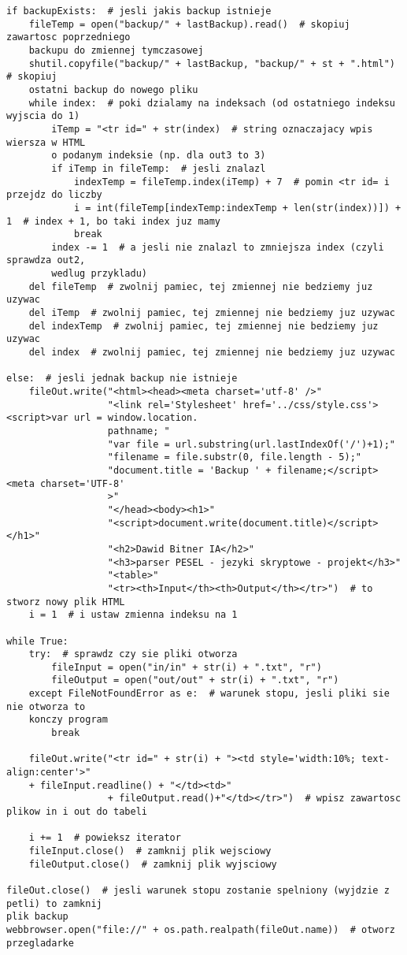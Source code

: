 \documentclass[12pt,a4paper]{article}
\begin{document}
\begin{verbatim}
if backupExists:  # jesli jakis backup istnieje
    fileTemp = open("backup/" + lastBackup).read()  # skopiuj zawartosc poprzedniego 
    backupu do zmiennej tymczasowej
    shutil.copyfile("backup/" + lastBackup, "backup/" + st + ".html")  # skopiuj 
    ostatni backup do nowego pliku
    while index:  # poki dzialamy na indeksach (od ostatniego indeksu wyjscia do 1)
        iTemp = "<tr id=" + str(index)  # string oznaczajacy wpis wiersza w HTML 
        o podanym indeksie (np. dla out3 to 3)
        if iTemp in fileTemp:  # jesli znalazl
            indexTemp = fileTemp.index(iTemp) + 7  # pomin <tr id= i przejdz do liczby
            i = int(fileTemp[indexTemp:indexTemp + len(str(index))]) + 1  # index + 1, bo taki index juz mamy
            break
        index -= 1  # a jesli nie znalazl to zmniejsza index (czyli sprawdza out2, 
        wedlug przykladu)
    del fileTemp  # zwolnij pamiec, tej zmiennej nie bedziemy juz uzywac
    del iTemp  # zwolnij pamiec, tej zmiennej nie bedziemy juz uzywac
    del indexTemp  # zwolnij pamiec, tej zmiennej nie bedziemy juz uzywac
    del index  # zwolnij pamiec, tej zmiennej nie bedziemy juz uzywac

else:  # jesli jednak backup nie istnieje
    fileOut.write("<html><head><meta charset='utf-8' />"
				  "<link rel='Stylesheet' href='../css/style.css'><script>var url = window.location.
				  pathname; "
                  "var file = url.substring(url.lastIndexOf('/')+1);"
                  "filename = file.substr(0, file.length - 5);"
                  "document.title = 'Backup ' + filename;</script><meta charset='UTF-8'
                  >"
                  "</head><body><h1>"
                  "<script>document.write(document.title)</script></h1>"
				  "<h2>Dawid Bitner IA</h2>"
				  "<h3>parser PESEL - jezyki skryptowe - projekt</h3>"
                  "<table>"
                  "<tr><th>Input</th><th>Output</th></tr>")  # to stworz nowy plik HTML
    i = 1  # i ustaw zmienna indeksu na 1

while True:
    try:  # sprawdz czy sie pliki otworza
        fileInput = open("in/in" + str(i) + ".txt", "r")
        fileOutput = open("out/out" + str(i) + ".txt", "r")
    except FileNotFoundError as e:  # warunek stopu, jesli pliki sie nie otworza to 
    konczy program
        break

    fileOut.write("<tr id=" + str(i) + "><td style='width:10%; text-align:center'>" 
    + fileInput.readline() + "</td><td>"
                  + fileOutput.read()+"</td></tr>")  # wpisz zawartosc plikow in i out do tabeli

    i += 1  # powieksz iterator
    fileInput.close()  # zamknij plik wejsciowy
    fileOutput.close()  # zamknij plik wyjsciowy

fileOut.close()  # jesli warunek stopu zostanie spelniony (wyjdzie z petli) to zamknij 
plik backup
webbrowser.open("file://" + os.path.realpath(fileOut.name))  # otworz przegladarke
	
	
	\end{verbatim}
\end{document}
